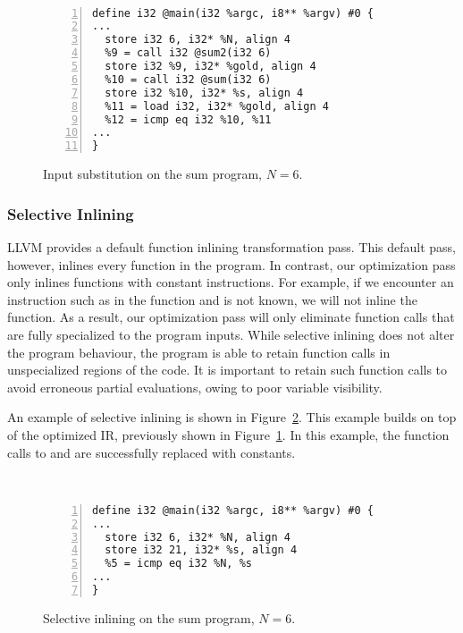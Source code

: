 \begin{figure}[htbp]\
\begin{Verbatim}[frame=single,fontsize={\scriptsize},numbers=left,numbersep=5pt,xleftmargin=10pt]
define i32 @main(i32 %argc, i8** %argv) #0 {
...
  store i32 6, i32* %N, align 4
  %9 = call i32 @sum2(i32 6)
  store i32 %9, i32* %gold, align 4
  %10 = call i32 @sum(i32 6)
  store i32 %10, i32* %s, align 4
  %11 = load i32, i32* %gold, align 4
  %12 = icmp eq i32 %10, %11
...
}
\end{Verbatim}
\caption{Input substitution on the sum program, $N=6$.}
\label{fig:input_sub_ir}
\end{figure}

\bigbreak

\subsubsection{Selective Inlining}

LLVM provides a default function inlining transformation pass.
This default pass, however, inlines every function in the program.
In contrast, our optimization pass only inlines functions with constant instructions.
For example, if we encounter an instruction such as \inlinecode{\%x = add i32 1, \%y} in the function and  is not known, we will not inline the function.
As a result, our optimization pass will only eliminate function calls that are fully specialized to the program inputs.
While selective inlining does not alter the program behaviour, the program is able to retain function calls in unspecialized regions of the code.
It is important to retain such function calls to avoid erroneous partial evaluations, owing to poor variable visibility.

An example of selective inlining is shown in Figure~\ref{fig:inlining_ir}.
This example builds on top of the optimized IR, previously shown in Figure~\ref{fig:input_sub_ir}.
In this example, the function calls to \inlinecode{sum2()} and \inlinecode{sum()} are successfully replaced with constants.

\begin{figure}[htbp]\
\begin{Verbatim}[frame=single,fontsize={\scriptsize},numbers=left,numbersep=5pt,xleftmargin=10pt]
define i32 @main(i32 %argc, i8** %argv) #0 {
...
  store i32 6, i32* %N, align 4
  store i32 21, i32* %s, align 4
  %5 = icmp eq i32 %N, %s
...
}
\end{Verbatim}
\caption{Selective inlining on the sum program, $N=6$.}
\label{fig:inlining_ir}
\end{figure}
